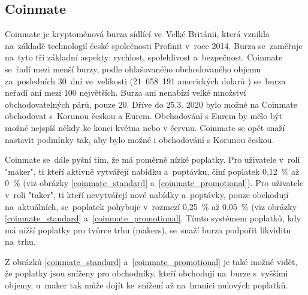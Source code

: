 \documentclass[thesis=B,czech]{FITthesis}[2019/03/21]
\begin{document}
\subsection{Coinmate}
Coinmate je kryptoměnová burza sídlící ve~Velké Británii, která vznikla \linebreak na~základě technologií české společnosti Profinit v~roce 2014. Burza se~zaměřuje na~tyto tři základní aspekty: rychlost, spolehlivost a~bezpečnost. Coinmate se~řadí mezi menší burzy, podle ohlašovaného obchodovaného objemu za~posledních 30~dní ve~velikosti (21~658~191 amerických dolarů \cite{coin360}) se~burza neřadí ani mezi 100 největších. \cite{coinmarketcap} Burza ani nenabízí velké množství obchodovatelných párů, pouze 20. Dříve do 25.3. 2020 bylo možné na Coinmate obchodovat s~Korunou českou a Eurem. Obchodování s Eurem by mělo být možné nejspíš někdy ke konci května nebo v červnu. Coinmate se opět snaží nastavit podmínky tak, aby bylo možné i obchodování s Korunou českou. \cite{coinmate_blog}  

Coinmate se~dále pyšní tím, že má poměrně nízké poplatky. Pro uživatele v~roli "maker", ti kteří aktivně vytvářejí nabídku a~poptávku, činí poplatek 0,12~\% až 0~\% (viz obrázky \ref{coinmate_standard} a~\ref{coinmate_promotional}). Pro uživatele v~roli "taker", ti kteří nevytvářejí nové nabídky a~poptávky, pouze obchodují na~aktuálních, se~poplatek pohybuje v~rozmezí 0,25~\% až 0.05~\% (viz obrázky \ref{coinmate_standard} a~\ref{coinmate_promotional}. Tímto systémem poplatků, kdy má nižší poplatky pro tvůrce trhu (makers), se~snaží burza podpořit likviditu na~trhu. \cite{cryptowisser_coinmate} \cite{coinmate_fees}

Z obrázků \ref{coinmate_standard} a~\ref{coinmate_promotional} je také možné vidět, že poplatky jsou sníženy pro obchodníky, kteří obchodují na~burze s~vyššími objemy, u~maker tak může dojít ke~snížení až na~hranici nulových poplatků. \cite{coinmate_fees}
\end{document}
